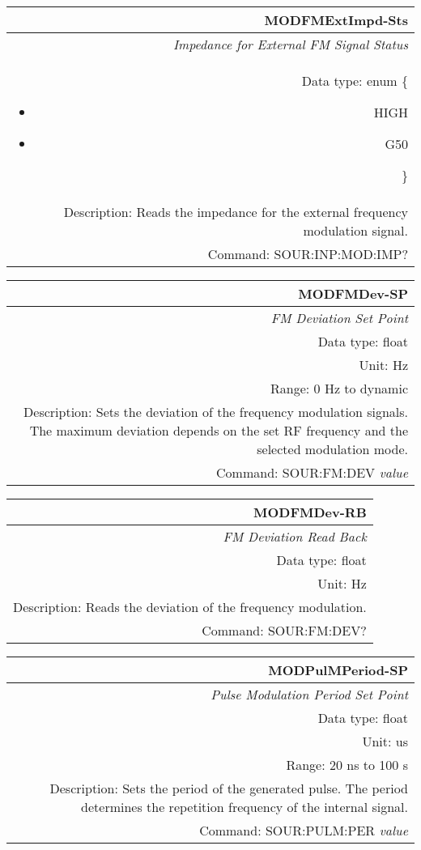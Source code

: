 \documentclass[openany]{article}
\begin{document}
		\begin{tabular}{N}
			\hline
			\bfseries MODFMExtImpd-Sts \\ \hline
			\emph{Impedance for External FM Signal Status} \\
			Data type: enum \{\begin{itemize}[noitemsep]
				\small
				\item[] HIGH
				\item[] G50
			\end{itemize}\} \\ 
			Description: Reads the impedance for the external frequency modulation signal. \\
			Command: SOUR:INP:MOD:IMP? \\

		\end{tabular}
%
		\begin{tabular}{N}
			\hline
			\bfseries MODFMDev-SP \\ \hline
			\emph{FM Deviation Set Point} \\
			Data type: float \\
			Unit: Hz \\  
			Range: 0 Hz to dynamic \\
			Description: Sets the deviation of the frequency modulation signals. The maximum deviation depends on the set RF frequency and the selected modulation mode. \\
			Command: SOUR:FM:DEV \emph{value} \\
			
		\end{tabular}


		\begin{tabular}{N}
			\hline
			\bfseries MODFMDev-RB \\ \hline
			\emph{FM Deviation Read Back} \\
			Data type: float \\
			Unit: Hz \\
			Description: Reads the deviation of the frequency modulation. \\
			Command: SOUR:FM:DEV? \\

		\end{tabular}
%
		\begin{tabular}{N}
			\hline
			\bfseries MODPulMPeriod-SP \\ \hline
			\emph{Pulse Modulation Period Set Point} \\
			Data type: float \\
			Unit: us \\ 
			Range: 20 ns to 100 s \\
			Description: Sets the period of the generated pulse. The period determines the repetition frequency of the internal signal. \\
			Command: SOUR:PULM:PER \emph{value} \\
			
		\end{tabular}
\end{document}
